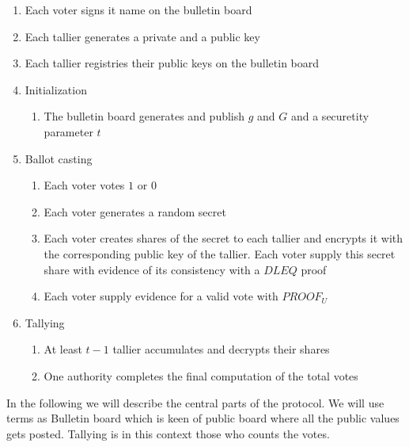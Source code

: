 \begin{infobox}
\begin{enumerate}
\item Each voter signs it name on the bulletin board
\item Each tallier generates a private and a public key
\item Each tallier registries their public keys on the bulletin board
\item Initialization
\begin{enumerate}
\item The bulletin board generates and publish $g$ and $G$ and a securetity parameter $t$
\end{enumerate}
\item Ballot casting
\begin{enumerate}
\item Each voter votes $1$ or $0$
\item Each voter generates a random secret
\item Each voter creates shares of the secret to each tallier and encrypts it with the corresponding public key of the tallier. Each voter supply this secret share with evidence of its consistency with a $DLEQ$ proof
\item Each voter supply evidence for a valid vote with $PROOF_U$
\end{enumerate}
\item Tallying
\begin{enumerate}
\item At least $t-1$ tallier accumulates and decrypts their shares
\item One authority completes the final computation of the total votes
\end{enumerate}
\end{enumerate}
\end{infobox}

\noindent
In the following we will describe the central parts of the protocol. We will use terms as Bulletin board which is keen of public board where all the public values gets posted. Tallying is in this context those who counts the votes.

